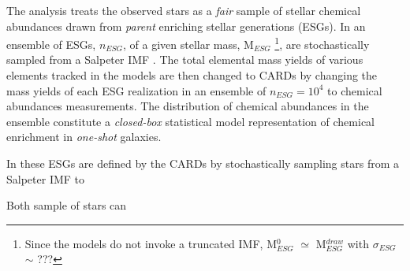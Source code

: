 The analysis treats the observed stars as a {\it fair} sample of stellar chemical abundances drawn from {\it parent} enriching stellar generations (ESGs). In \cite{Lee_2013} an ensemble of ESGs, $n_{ESG}$, of a given stellar mass, M$_{ESG}$
\footnote{Since the models do not invoke a truncated IMF, M$_{ESG}^0$ $\simeq$ M$_{ESG}^{draw}$ with $\sigma_{ESG}$ $\sim$ ???}, 
are stochastically sampled from a Salpeter IMF \citep{Salpeter_1955}. The total elemental mass yields of various elements tracked in the models are then changed to CARDs by changing the mass yields of each ESG realization in an ensemble of $n_{ESG} = 10^4$ to chemical abundances measurements. The distribution of chemical abundances in the ensemble constitute a {\it closed-box} statistical model representation of chemical enrichment in {\it one-shot} galaxies. 


In \cite{Lee_2013} these ESGs are defined by the CARDs by stochastically sampling stars from a Salpeter IMF \citep{Salpeter_1955} to    

Both sample of stars can 